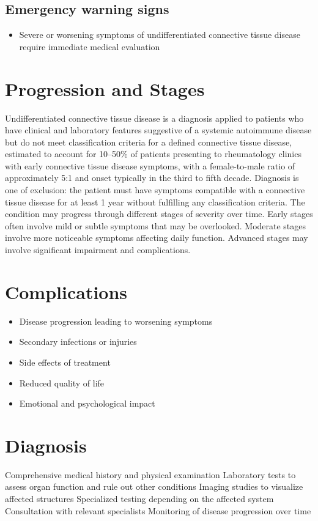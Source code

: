 \subsection{Emergency warning signs}
\begin{itemize}[noitemsep]
  \item Severe or worsening symptoms of undifferentiated connective tissue disease require immediate medical evaluation
\end{itemize}
\section{Progression and Stages}
Undifferentiated connective tissue disease is a diagnosis applied to patients who have clinical and laboratory features suggestive of a systemic autoimmune disease but do not meet classification criteria for a defined connective tissue disease, estimated to account for 10--50\% of patients presenting to rheumatology clinics with early connective tissue disease symptoms, with a female-to-male ratio of approximately 5:1 and onset typically in the third to fifth decade. Diagnosis is one of exclusion: the patient must have symptoms compatible with a connective tissue disease for at least 1 year without fulfilling any classification criteria. The condition may progress through different stages of severity over time. Early stages often involve mild or subtle symptoms that may be overlooked. Moderate stages involve more noticeable symptoms affecting daily function. Advanced stages may involve significant impairment and complications.
\section{Complications}
\begin{itemize}[noitemsep]
  \item Disease progression leading to worsening symptoms
  \item Secondary infections or injuries
  \item Side effects of treatment
  \item Reduced quality of life
  \item Emotional and psychological impact
\end{itemize}
\section{Diagnosis}
Comprehensive medical history and physical examination Laboratory tests to assess organ function and rule out other conditions Imaging studies to visualize affected structures Specialized testing depending on the affected system Consultation with relevant specialists Monitoring of disease progression over time

